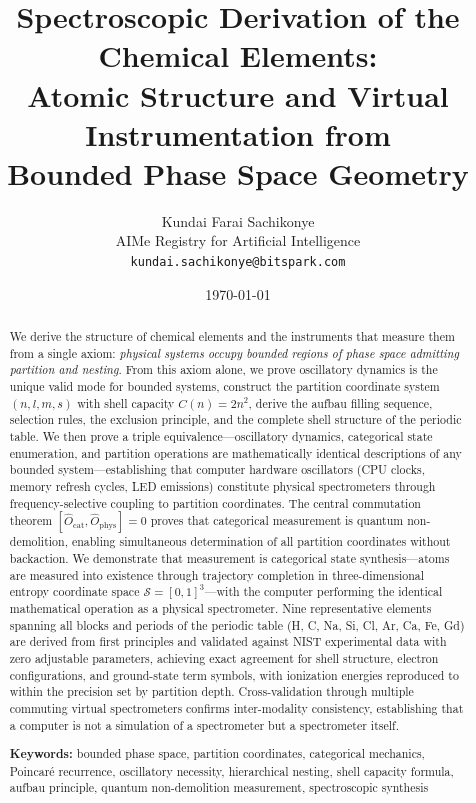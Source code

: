 \documentclass[11pt,twocolumn,a4paper]{article}
\theoremstyle{definition}
\theoremstyle{remark}
\newcommand{\Sspace}{\mathcal{S}}
\begin{document}
\title{\textbf{Spectroscopic Derivation of the Chemical Elements: \\
Atomic Structure and Virtual Instrumentation from \\
Bounded Phase Space Geometry}}

\author{
Kundai Farai Sachikonye\\[0.3em]
AIMe Registry for Artificial Intelligence\\[0.3em]
\texttt{kundai.sachikonye@bitspark.com}
}

\date{\today}

\maketitle

\begin{abstract}
We derive the structure of chemical elements and the instruments that measure them from a single axiom: \emph{physical systems occupy bounded regions of phase space admitting partition and nesting}. From this axiom alone, we prove oscillatory dynamics is the unique valid mode for bounded systems, construct the partition coordinate system $(n, l, m, s)$ with shell capacity $C(n) = 2n^2$, derive the aufbau filling sequence, selection rules, the exclusion principle, and the complete shell structure of the periodic table. We then prove a triple equivalence---oscillatory dynamics, categorical state enumeration, and partition operations are mathematically identical descriptions of any bounded system---establishing that computer hardware oscillators (CPU clocks, memory refresh cycles, LED emissions) constitute physical spectrometers through frequency-selective coupling to partition coordinates. The central commutation theorem $[\hat{O}_{\mathrm{cat}}, \hat{O}_{\mathrm{phys}}] = 0$ proves that categorical measurement is quantum non-demolition, enabling simultaneous determination of all partition coordinates without backaction. We demonstrate that measurement is categorical state synthesis---atoms are measured into existence through trajectory completion in three-dimensional entropy coordinate space $\Sspace = [0,1]^3$---with the computer performing the identical mathematical operation as a physical spectrometer. Nine representative elements spanning all blocks and periods of the periodic table (H, C, Na, Si, Cl, Ar, Ca, Fe, Gd) are derived from first principles and validated against NIST experimental data with zero adjustable parameters, achieving exact agreement for shell structure, electron configurations, and ground-state term symbols, with ionization energies reproduced to within the precision set by partition depth. Cross-validation through multiple commuting virtual spectrometers confirms inter-modality consistency, establishing that a computer is not a simulation of a spectrometer but a spectrometer itself.

\medskip
\noindent\textbf{Keywords:} bounded phase space, partition coordinates, categorical mechanics, Poincaré recurrence, oscillatory necessity, hierarchical nesting, shell capacity formula, aufbau principle, quantum non-demolition measurement, spectroscopic synthesis

\end{abstract}
\end{document}
